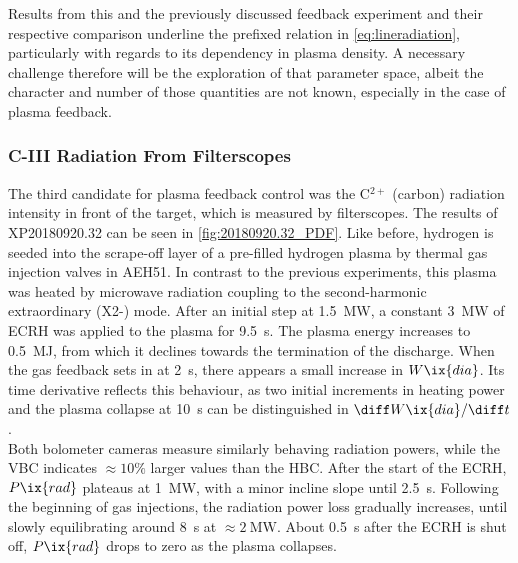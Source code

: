                 Results from this and the previously discussed feedback experiment and their respective comparison underline the prefixed relation in \cref{eq:lineradiation}, particularly with regards to its dependency in plasma density. A necessary challenge therefore will be the exploration of that parameter space, albeit the character and number of those quantities are not known, especially in the case of plasma feedback.%
%
            \subsubsection*{C-III Radiation From Filterscopes}
%
                The third candidate for plasma feedback control was the C$^{2+}$ (carbon) radiation intensity in front of the target, which is measured by filterscopes. The results of XP20180920.32 can be seen in \cref{fig:20180920.32_PDF}. Like before, hydrogen is seeded into the scrape-off layer of a pre-filled hydrogen plasma by thermal gas injection valves in AEH51. In contrast to the previous experiments, this plasma was heated by microwave radiation coupling to the second-harmonic extraordinary (X2-) mode. After an initial step at \SI{1.5}{\mega\watt}, a constant \SI{3}{\mega\watt} of ECRH was applied to the plasma for \SI{9.5}{\second}. The plasma energy increases to \SI{0.5}{\mega\joule}, from which it declines towards the termination of the discharge. When the gas feedback sets in at \SI{2}{\second}, there appears a small increase in $W\ix{dia}$. Its time derivative reflects this behaviour, as two initial increments in heating power and the plasma collapse at \SI{10}{\second} can be distinguished in $\diff W\ix{dia}/\diff t$.\\%
                Both bolometer cameras measure similarly behaving radiation powers, while the VBC indicates $\approx10\%$ larger values than the HBC. After the start of the ECRH, $P\ix{rad}$ plateaus at \SI{1}{\mega\watt}, with a minor incline slope until \SI{2.5}{\second}. Following the beginning of gas injections, the radiation power loss gradually increases, until slowly equilibrating around \SI{8}{\second} at $\approx\SI{2}{\mega\watt}$. About \SI{0.5}{\second} after the ECRH is shut off, $P\ix{rad}$ drops to zero as the plasma collapses.\\%
%
